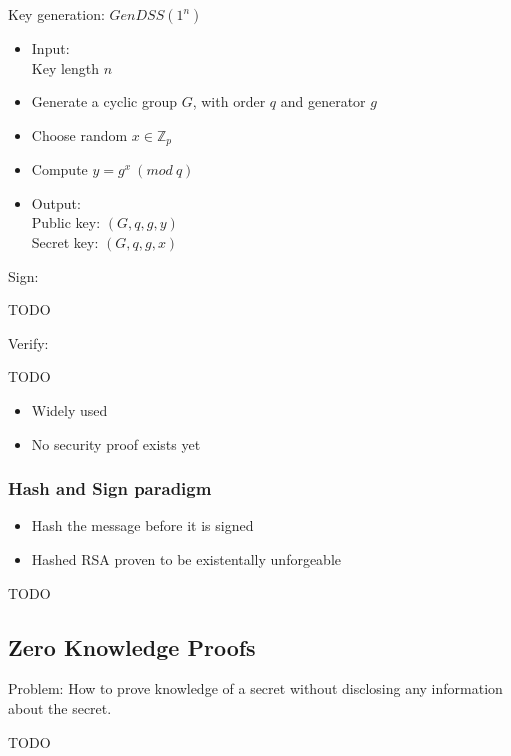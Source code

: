 \documentclass[a4paper]{article}
\begin{document}
Key generation: $GenDSS(1^{n})$
\begin{itemize}
  \item
    Input: \\
    Key length $n$
  \item Generate a cyclic group $G$, with order $q$ and generator $g$
  \item Choose random $x \in \mathbb{Z}_{p}$
  \item Compute $y = g^{x} \: (mod \: q)$
  \item
    Output: \\
    Public key: $(G, q, g, y)$ \\
    Secret key: $(G, q, g, x)$
\end{itemize}

Sign:

TODO

Verify:

TODO

\begin{itemize}
  \item Widely used
  \item No security proof exists yet
\end{itemize}

\subsubsection{Hash and Sign paradigm}

\begin{itemize}
  \item Hash the message before it is signed
  \item Hashed RSA proven to be existentally unforgeable
\end{itemize}

TODO

\subsection{Zero Knowledge Proofs}

Problem: How to prove knowledge of a secret without disclosing any information
about the secret.

TODO
\end{document}
